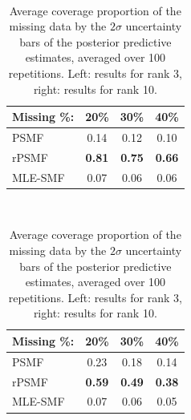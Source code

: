 \documentclass{mldsmsc}
\begin{document}
\begin{table}[H]
    \centering
    \begin{minipage}{0.45\textwidth}
        \centering
         \\[0.5ex]
        \begin{threeparttable}
            \begin{tabular}{lccc}
                \hline
                Missing \%: & 20\% & 30\% & 40\% \\
                \hline
                PSMF & 0.14 & 0.12 & 0.10 \\
                rPSMF & \textbf{0.81} & \textbf{0.75} & \textbf{0.66} \\
                MLE-SMF & 0.07 & 0.06 & 0.06 \\
                \hline
            \end{tabular}
        \end{threeparttable}
    \end{minipage}%
    \hspace{0.1\textwidth}%
    \begin{minipage}{0.45\textwidth}
        \centering
         \\[0.5ex]
        \begin{threeparttable}
            \begin{tabular}{lccc}
                \hline
                Missing \%: & 20\% & 30\% & 40\% \\
                \hline
                PSMF & 0.23 & 0.18 & 0.14 \\
                rPSMF & \textbf{0.59} & \textbf{0.49} & \textbf{0.38} \\
                MLE-SMF & 0.07 & 0.06 & 0.05 \\
                \hline
            \end{tabular}
        \end{threeparttable}
    \end{minipage}
    \caption{Average coverage proportion of the missing data by the $2\sigma$ uncertainty bars of the posterior predictive estimates, averaged over 100 repetitions. Left: results for rank 3, right: results for rank 10.}
\end{table}

\end{document}
